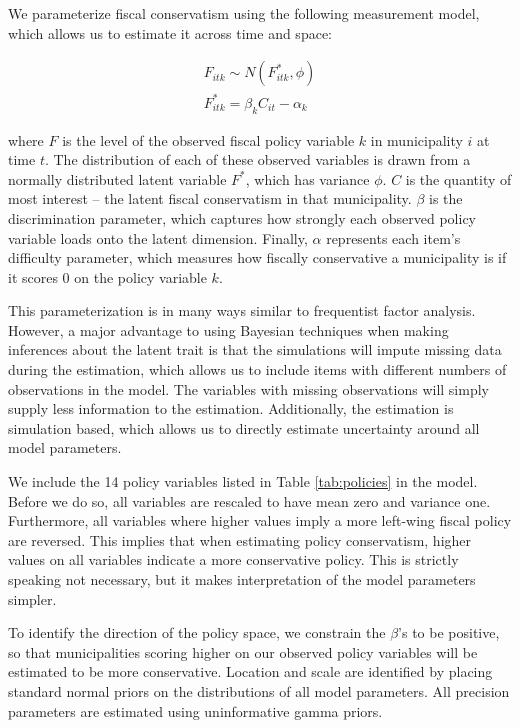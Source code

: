 \documentclass[a4paper,12pt]{article}
\begin{document}
\setcounter{table}{0}
\setcounter{figure}{0}

We parameterize fiscal conservatism using the following measurement model, which allows us to estimate it across time and space:

\begin{gather*}
F_{itk} \sim N(F^*_{itk}, \phi)\\
F^*_{itk} = \beta_k C_{it} - \alpha_{k}
\end{gather*}

where $F$ is the level of the observed fiscal policy variable $k$ in municipality $i$ at time $t$. The distribution of each of these observed variables is drawn from a normally distributed latent variable $F^*$, which has variance $\phi$. $C$ is the quantity of most interest -- the latent fiscal conservatism in that municipality. $\beta$ is the discrimination parameter, which captures how strongly each observed policy variable loads onto the latent dimension. Finally, $\alpha$ represents each item's difficulty parameter, which measures how fiscally conservative a municipality is if it scores 0 on the policy variable $k$.

This parameterization is in many ways similar to frequentist factor analysis. However, a major advantage to using Bayesian techniques when making inferences about the latent trait is that the simulations will impute missing data during the estimation, which allows us to include items with different numbers of observations in the model. The variables with missing observations will simply supply less information to the estimation. Additionally, the estimation is simulation based, which allows us to directly estimate uncertainty around all model parameters. 

We include the 14 policy variables listed in Table  \ref{tab:policies} in the model. Before we do so, all variables are rescaled to have mean zero and variance one. Furthermore, all variables where higher values imply a more left-wing fiscal policy are reversed. This implies that when estimating policy conservatism, higher values on all variables indicate a more conservative policy. This is strictly speaking not necessary, but it makes interpretation of the model parameters simpler.

To identify the direction of the policy space, we constrain the $\beta$'s to be positive, so that municipalities scoring higher on our observed policy variables will be estimated to be more conservative. Location and scale are identified by placing standard normal priors on the distributions of all model parameters. All precision parameters are estimated using uninformative gamma priors.
\end{document}
